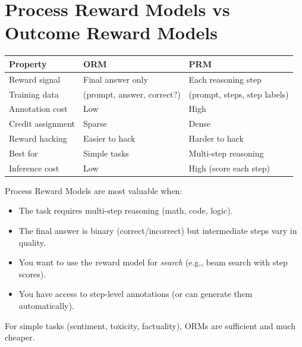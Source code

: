 \section{Process Reward Models vs Outcome Reward Models}
\label{sec:prm-orm}

\begin{keybox}
\begin{tabular}{@{}lp{5cm}p{8cm}@{}}
\toprule
\textbf{Property} & \textbf{ORM} & \textbf{PRM} \\
\midrule
Reward signal & Final answer only & Each reasoning step \\
Training data & (prompt, answer, correct?) & (prompt, steps, step labels) \\
Annotation cost & Low & High \\
Credit assignment & Sparse & Dense \\
Reward hacking & Easier to hack & Harder to hack \\
Best for & Simple tasks & Multi-step reasoning \\
Inference cost & Low & High (score each step) \\
\bottomrule
\end{tabular}
\end{keybox}

\begin{intuitionbox}
Process Reward Models are most valuable when:

\begin{itemize}
  \item The task requires multi-step reasoning (math, code, logic).
  \item The final answer is binary (correct/incorrect) but intermediate steps vary in quality.
  \item You want to use the reward model for \emph{search} (e.g., beam search with step scores).
  \item You have access to step-level annotations (or can generate them automatically).
\end{itemize}

For simple tasks (sentiment, toxicity, factuality), ORMs are sufficient and much cheaper.
\end{intuitionbox}

